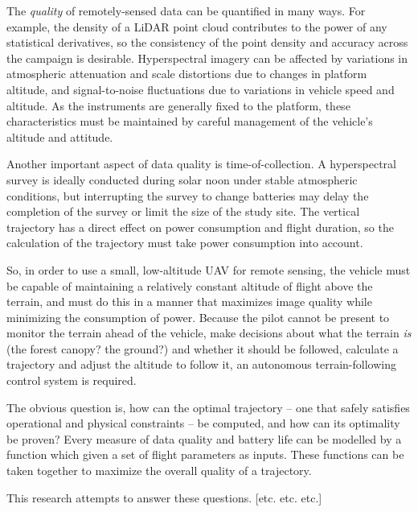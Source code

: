 The \emph{quality} of remotely-sensed data can be quantified in many ways. For example, the density of a LiDAR point cloud contributes to the power of any statistical derivatives, so the consistency of the point density and accuracy across the campaign is desirable. Hyperspectral imagery can be affected by variations in atmospheric attenuation and scale distortions due to changes in platform altitude, and signal-to-noise fluctuations due to variations in vehicle speed and altitude. As the instruments are generally fixed to the platform, these characteristics must be maintained by careful management of the vehicle's altitude and attitude.

Another important aspect of data quality is time-of-collection. A hyperspectral survey is ideally conducted during solar noon under stable atmospheric conditions, but interrupting the survey to change batteries may delay the completion of the survey or limit the size of the study site. The vertical trajectory has a direct effect on power consumption and flight duration, so the calculation of the trajectory must take power consumption into account.

So, in order to use a small, low-altitude UAV for remote sensing, the vehicle must be capable of maintaining a relatively constant altitude of flight above the terrain, and must do this in a manner that maximizes image quality while minimizing the consumption of power. Because the pilot cannot be present to monitor the terrain ahead of the vehicle, make decisions about what the terrain \emph{is} (the forest canopy? the ground?) and whether it should be followed, calculate a trajectory and adjust the altitude to follow it, an autonomous terrain-following control system is required.

The obvious question is, how can the optimal trajectory -- one that safely satisfies operational and physical constraints -- be computed, and how can its optimality be proven? Every measure of data quality and battery life can be modelled by a function which given a set of flight parameters as inputs. These functions can be taken together to maximize the overall quality of a trajectory.

This research attempts to answer these questions. [etc. etc. etc.]